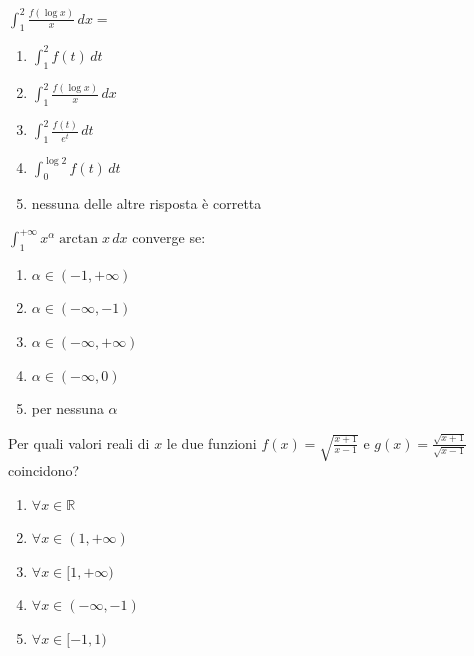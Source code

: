 \begin{quiz}
$\displaystyle\int_1^2\frac{f(\log x)}x\,dx=$

\begin{enumerate}
\item $\int_1^2 f(t)\,dt$
\item $\int_1^2\frac{f(\log x)}x\,dx$
\item $\int_1^2\frac{f(t)}{e^t}\,dt$
\item $\int_0^{\log2}f(t)\,dt$
\item nessuna delle altre risposta è corretta
\end{enumerate}
\end{quiz}

\begin{quiz}
$\displaystyle\int_1^{+\infty}x^\alpha\arctan x\,dx$ converge se:

\begin{enumerate}
\item $\alpha\in(-1,+\infty)$
\item $\alpha\in(-\infty,-1)$
\item $\alpha\in(-\infty,+\infty)$
\item $\alpha\in(-\infty,0)$
\item per nessuna $\alpha$
\end{enumerate}
\end{quiz}

\begin{quiz}
Per quali valori reali di $x$ le due funzioni $f(x)=\sqrt{\frac{x+1}{x-1}}$ e $g(x)=\frac{\sqrt{x+1}}{\sqrt{x-1}}$ coincidono?

\begin{enumerate}
\item $\forall x\in\mathbb R$
\item $\forall x\in(1,+\infty)$
\item $\forall x\in[1,+\infty)$
\item $\forall x\in(-\infty,-1)$
\item $\forall x\in[-1,1)$
\end{enumerate}
\end{quiz}

